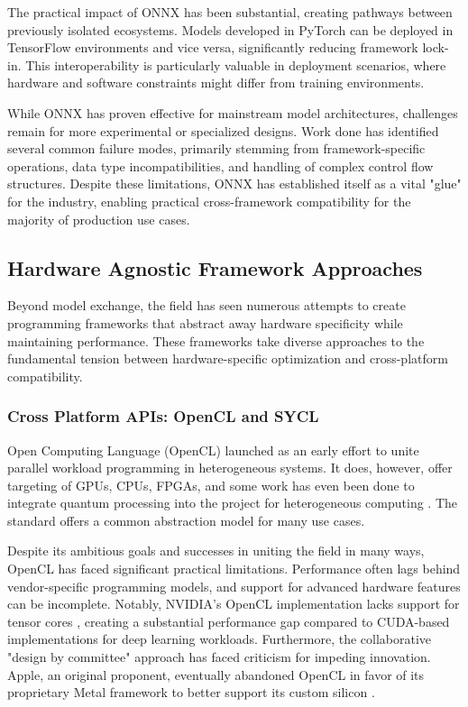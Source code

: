 \documentclass[manuscript,screen,review,format=acmsmall]{acmart}
\begin{document}
The practical impact of ONNX has been substantial, creating pathways between previously isolated ecosystems. Models developed in PyTorch can be deployed in TensorFlow environments and vice versa, significantly reducing framework lock-in. This interoperability is particularly valuable in deployment scenarios, where hardware and software constraints might differ from training environments.

While ONNX has proven effective for mainstream model architectures, challenges remain for more experimental or specialized designs. Work done \cite{ONNXFailures} has identified several common failure modes, primarily stemming from framework-specific operations, data type incompatibilities, and handling of complex control flow structures. Despite these limitations, ONNX has established itself as a vital "glue" for the industry, enabling practical cross-framework compatibility for the majority of production use cases.

\subsection{Hardware Agnostic Framework Approaches}

Beyond model exchange, the field has seen numerous attempts to create programming frameworks that abstract away hardware specificity while maintaining performance. These frameworks take diverse approaches to the fundamental tension between hardware-specific optimization and cross-platform compatibility.

\subsubsection{Cross Platform APIs: OpenCL and SYCL}

Open Computing Language (OpenCL) launched as an early effort to unite parallel workload programming \cite{OpenCLLaunch} in heterogeneous systems. It does, however, offer targeting of GPUs, CPUs, FPGAs, and some work has even been done to integrate quantum processing into the project for heterogeneous computing \cite{QPU}. The standard offers a common abstraction model for many use cases.

Despite its ambitious goals and successes in uniting the field in many ways, OpenCL has faced significant practical limitations. Performance often lags behind vendor-specific programming models, and support for advanced hardware features can be incomplete. Notably, NVIDIA's OpenCL implementation lacks support for tensor cores \cite{Modular5}, creating a substantial performance gap compared to CUDA-based implementations for deep learning workloads. Furthermore, the collaborative "design by committee" approach has faced criticism for impeding innovation. Apple, an original proponent, eventually abandoned OpenCL in favor of its proprietary Metal framework to better support its custom silicon \cite{Modular5}.
\end{document}

